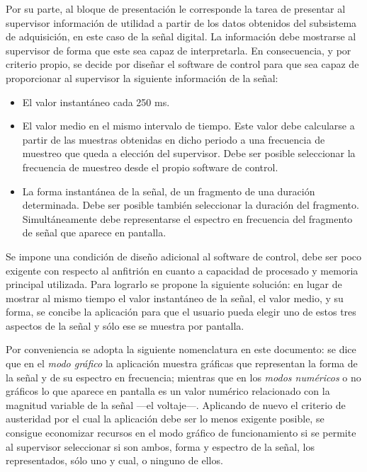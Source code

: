 Por su parte, al bloque de presentación le corresponde la tarea de presentar al supervisor información de utilidad a partir de los datos obtenidos del subsistema de adquisición, en este caso de la señal digital. La información debe mostrarse al supervisor de forma que este sea capaz de interpretarla. En consecuencia, y por criterio propio, se decide por diseñar el software de control para que sea capaz de proporcionar al supervisor la siguiente información de la señal: %

\begin{itemize}
	\item El valor instantáneo cada 250 ms.
	\item El valor medio en el mismo intervalo de tiempo. Este valor debe calcularse a partir de las muestras obtenidas en dicho periodo a una frecuencia de muestreo que queda a elección del supervisor. Debe ser posible seleccionar la frecuencia de muestreo desde el propio software de control.
	\item La forma instantánea de la señal, de un fragmento de una duración determinada. Debe ser posible también seleccionar la duración del fragmento. Simultáneamente debe representarse el espectro en frecuencia del fragmento de señal que aparece en pantalla.
\end{itemize}

Se impone una condición de diseño adicional al software de control, debe ser poco exigente con respecto al \pc{} anfitrión en cuanto a capacidad de procesado y memoria principal utilizada. Para lograrlo se propone la siguiente solución: en lugar de mostrar al mismo tiempo el valor instantáneo de la señal, el valor medio, y su forma, se concibe la aplicación para que el usuario pueda elegir uno de estos tres aspectos de la señal y sólo ese se muestra por pantalla.\par
Por conveniencia se adopta la siguiente nomenclatura en este documento: se dice que en el \emph{modo gráfico} la aplicación muestra gráficas que representan la forma de la señal y de su espectro en frecuencia; mientras que en los \emph{modos numéricos} o no gráficos lo que aparece en pantalla es un valor numérico relacionado con la magnitud variable de la señal ---el voltaje---. Aplicando de nuevo el criterio de austeridad por el cual la aplicación debe ser lo menos exigente posible, se consigue economizar recursos en el modo gráfico de funcionamiento si se permite al supervisor seleccionar si son ambos, forma y espectro de la señal, los representados, sólo uno y cual, o ninguno de ellos.


